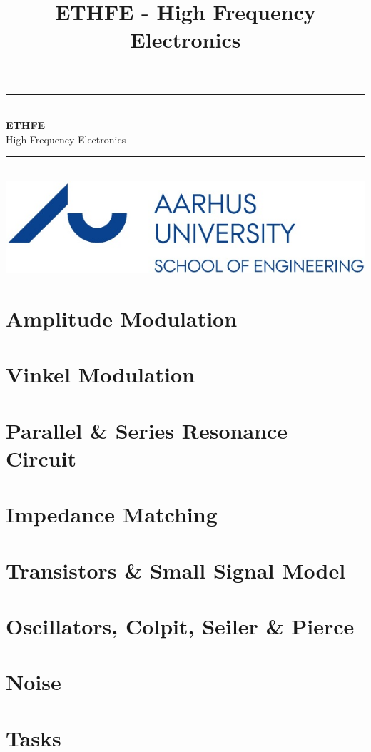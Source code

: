 \documentclass[12pt,a4paper,danish,oneside]{book}
\title{ETHFE - High Frequency Electronics}
\newcommand{\HRule}{\rule{\linewidth}{0.5mm}}
\begin{document}
\begin{titlepage}
	\clearpage\thispagestyle{empty}

	\begin{center}
		\HRule \\[0.4cm]
		{\huge \bfseries ETHFE} \\[.3cm] {\huge High Frequency Electronics}\\[0cm]
		\HRule \\[3.4cm]
		\includegraphics[width=0.5\linewidth]{graphics/au}
	\end{center}
	\renewcommand{\contentsname}{Indholdsfortegnelse}
	\tableofcontents

\end{titlepage}

 

\chapter{Amplitude Modulation}


\chapter{Vinkel Modulation}


\chapter{Parallel \& Series Resonance Circuit}


\chapter{Impedance Matching}


\chapter{Transistors \& Small Signal Model}


\chapter{Oscillators, Colpit, Seiler \& Pierce}


\chapter{Noise}


\chapter{Tasks}




\end{document}
